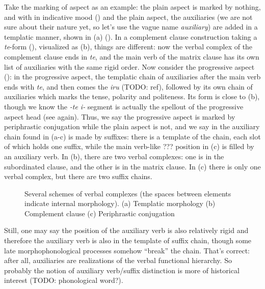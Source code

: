 \documentclass[UTF8, a4paper, oneside, scheme=plain]{ctexrep}
\newcommand*{\term}[1]{\emph{#1}}
\newcommand{\corpus}[1]{\emph{#1}}
\begin{document}
Take the marking of aspect as an example:
the plain aspect is marked by nothing, 
and with in indicative mood () and the plain aspect,
the auxiliaries (we are not sure about their nature yet, so let's use the vague name \term{auxiliary}) 
are added in a templatic manner, shown in (a) 
().
In a complement clause construction taking a \corpus{te}-form (),
visualized as (b),
things are different: now the verbal complex of the complement clause ends in \corpus{te},
and the main verb of the matrix clause has its own list of auxiliaries with the same rigid order.
Now consider the progressive aspect ():
in the progressive aspect, the templatic chain of auxiliaries after the main verb ends with \corpus{te},
and then comes the \corpus{iru} (TODO: ref), followed by its own chain of auxiliaries 
which marks the tense, polarity and politeness.
Its form is close to (b),
though we know the \corpus{-te i-} segment is actually the spellout of the progressive aspect head 
(see  again).
Thus, we say the progressive aspect is marked by periphrastic conjugation 
while the plain aspect is not,
and we say in the auxiliary chain found in 
(a-c)
is made by suffixes: 
there is a template of the chain, each slot of which holds one suffix,
while the main verb-like ??? position in (c) 
is filled by an auxiliary verb.
In (b),
there are two verbal complexes:
one is in the subordinated clause,
and the other is in the matrix clause.
In (c)
there is only one verbal complex,
but there are two suffix chains.

\begin{figure}[H]
    \centering
    
    \caption{Several schemes of verbal complexes (the spaces between elements indicate internal morphology). 
    (a) Templatic morphology (b) Complement clause (c) Periphrastic conjugation}
    \label{fig:verb-complex-scheme}
\end{figure}

Still, one may say the position of the auxiliary verb is also relatively rigid 
and therefore the auxiliary verb is also in the template of suffix chain,
though some late morphophonological processes somehow ``break'' the chain.
That's correct: after all, auxiliaries are realizations of the verbal functional hierarchy.
So probably the notion of auxiliary verb/suffix distinction is more of historical interest
(TODO: phonological word?).
\end{document}

